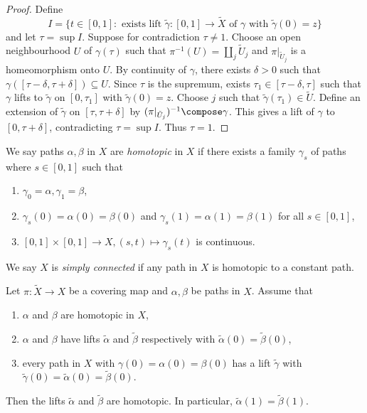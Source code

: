 \documentclass[a4paper]{article}
\begin{document}
\begin{proof}
  Define
  \[
    I = \{t \in [0, 1]: \text{ exists lift } \tilde \gamma: [0, 1] \to \tilde X \text{ of \(\gamma\) with } \tilde \gamma(0) = z\}
  \]
  and let \(\tau = \sup I\). Suppose for contradiction \(\tau \neq 1\). Choose an open neighbourhood \(U\) of \(\gamma(\tau)\) such that \(\pi^{-1}(U) = \coprod_j \tilde U_j\) and \(\pi|_{\tilde U_j}\) is a homeomorphism onto \(U\). By continuity of \(\gamma\), there exists \(\delta > 0\) such that \(\gamma([\tau - \delta, \tau + \delta]) \subseteq U\). Since \(\tau\) is the supremum, exists \(\tau_1 \in [\tau - \delta, \tau]\) such that \(\gamma\) lifts to \(\tilde \gamma\) on \([0, \tau_1]\) with \(\tilde \gamma(0) = z\). Choose \(j\) such that \(\tilde \gamma(\tau_1) \in \tilde U\). Define an extension of \(\tilde \gamma\) on \([\tau, \tau + \delta]\) by \((\pi|_{\tilde U_j})^{-1} \compose \gamma\). This gives a lift of \(\gamma\) to \([0, \tau + \delta]\), contradicting \(\tau = \sup I\). Thus \(\tau = 1\).
\end{proof}

\begin{definition}[homotopy]
  We say paths \(\alpha, \beta\) in \(X\) are \emph{homotopic} in \(X\) if there exists a family \(\gamma_s\) of paths where \(s \in [0, 1]\) such that
  \begin{enumerate}
  \item \(\gamma_0 = \alpha, \gamma_1 = \beta\),
  \item \(\gamma_s(0) = \alpha(0) = \beta(0)\) and \(\gamma_s(1) = \alpha(1) = \beta(1)\) for all \(s \in [0, 1]\),
  \item \([0, 1] \times [0, 1] \to X, (s, t) \mapsto \gamma_s(t)\) is continuous.
  \end{enumerate}
\end{definition}

\begin{definition}
  We say \(X\) is \emph{simply connected} if any path in \(X\) is homotopic to a constant path.
\end{definition}

\begin{theorem}
  Let \(\pi: \tilde X \to X\) be a covering map and \(\alpha, \beta\) be paths in \(X\). Assume that
  \begin{enumerate}
  \item \(\alpha\) and \(\beta\) are homotopic in \(X\),
  \item \(\alpha\) and \(\beta\) have lifts \(\tilde \alpha\) and \(\tilde \beta\) respectively with \(\tilde \alpha(0) = \tilde \beta(0)\),
  \item every path in \(X\) with \(\gamma(0) = \alpha(0) = \beta(0)\) has a lift \(\tilde \gamma\) with \(\tilde \gamma(0) = \tilde \alpha(0) = \tilde \beta(0)\).
  \end{enumerate}
  Then the lifts \(\tilde \alpha\) and \(\tilde \beta\) are homotopic. In particular, \(\tilde \alpha(1) = \tilde \beta(1)\).
\end{theorem}
\end{document}
